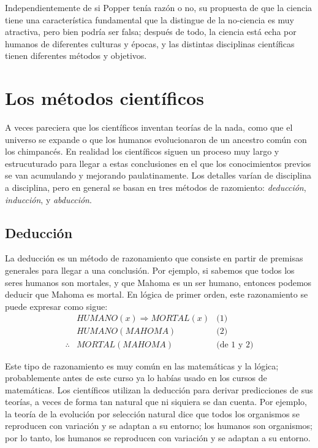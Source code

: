 Independientemente de si Popper tenía razón o no, su propuesta de que la ciencia
tiene una característica fundamental que la distingue de la no-ciencia es muy
atractiva, pero bien podría ser falsa; después de todo, la ciencia está echa por
humanos de diferentes culturas y épocas, y las distintas disciplinas científicas
tienen diferentes métodos y objetivos.

\section{Los métodos científicos}
\label{sec:losmetodoscientificos}

A veces pareciera que los científicos inventan teorías de la nada, como que el
universo se expande o que los humanos evolucionaron de un ancestro común con los
chimpancés.
En realidad los científicos siguen un proceso muy largo y estrucuturado para
llegar a estas conclusiones en el que los conocimientos previos se van
acumulando y mejorando paulatinamente.
Los detalles varían de disciplina a disciplina, pero en general se basan en tres
métodos de razomiento: \emph{deducción}, \emph{inducción}, y
\emph{abducción}.

\subsection*{Deducción}
\label{sub:deduccion}
La deducción es un método de razonamiento que consiste en partir de premisas
generales para llegar a una conclusión.
Por ejemplo, si sabemos que todos los seres humanos son mortales, y que Mahoma
es un ser humano, entonces podemos deducir que Mahoma es mortal.
En lógica de primer orden, este razonamiento se puede expresar como sigue:
\begin{align*}
               & \mathit{HUMANO}(x) \Rightarrow \mathit{MORTAL}(x) & \text{(1)}        \\
               & \mathit{HUMANO}(\mathit{MAHOMA})                  & \text{(2)}        \\
    \hline
    \therefore & \mathit{MORTAL}(\mathit{MAHOMA})                  & \text{(de 1 y 2)}
\end{align*}

Este tipo de razonamiento es muy común en las matemáticas y la lógica;
probablemente antes de este curso ya lo habías usado en los cursos de
matemáticas.
Los científicos utilizan la deducción para derivar predicciones de sus teorías,
a veces de forma tan natural que ni siquiera se dan cuenta.
Por ejemplo, la teoría de la evolución por selección natural dice que todos los
organismos se reproducen con variación y se adaptan a su entorno; los humanos
son organismos; por lo tanto, los humanos se reproducen con variación y se
adaptan a su entorno.

